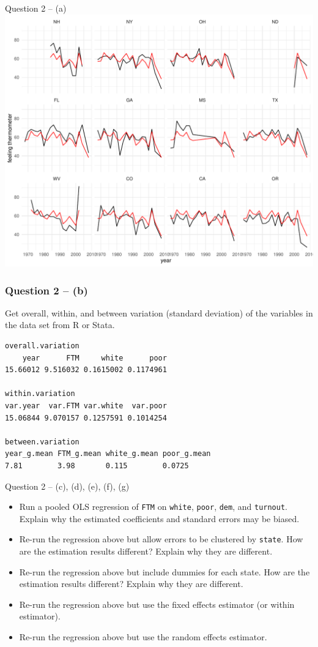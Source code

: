 \documentclass[xcolor=table,dvipsnames]{beamer}
\begin{document}
\begin{frame}{Question 2 -- (a)}
\centering
\includegraphics[scale=0.45]{pictures/week_24_Q2_a2.pdf} 
\end{frame}

\begin{frame}[fragile]
\frametitle{Question 2 -- (b)}
Get overall, within, and between variation (standard deviation) of the variables in the data set from R or Stata. \pause

\begin{verbatim}
overall.variation
    year      FTM     white      poor   
15.66012 9.516032 0.1615002 0.1174961

within.variation
var.year  var.FTM var.white  var.poor
15.06844 9.070157 0.1257591 0.1014254

between.variation
year_g.mean FTM_g.mean white_g.mean poor_g.mean
7.81        3.98       0.115        0.0725          
\end{verbatim}
\end{frame}

\begin{frame}{Question 2 -- (c), (d), (e), (f), (g)}
\begin{itemize}
\item[(c)] Run a pooled OLS regression of \texttt{FTM} on \texttt{white}, \texttt{poor}, \texttt{dem}, and \texttt{turnout}. Explain why the estimated coefficients and standard errors may be biased.
\item[(d)]  Re-run the regression above but allow errors to be clustered by \texttt{state}. How are the estimation results different? Explain why they are different.\\
\item[(e)] Re-run the regression above but include dummies for each state. How are the estimation results different? Explain why they are different.\\ 
\item[(f)] Re-run the regression above but use the fixed effects estimator (or within estimator). 
\item[(g)]  Re-run the regression above but use the random effects estimator. 
\end{itemize}
\end{frame}
\end{document}
